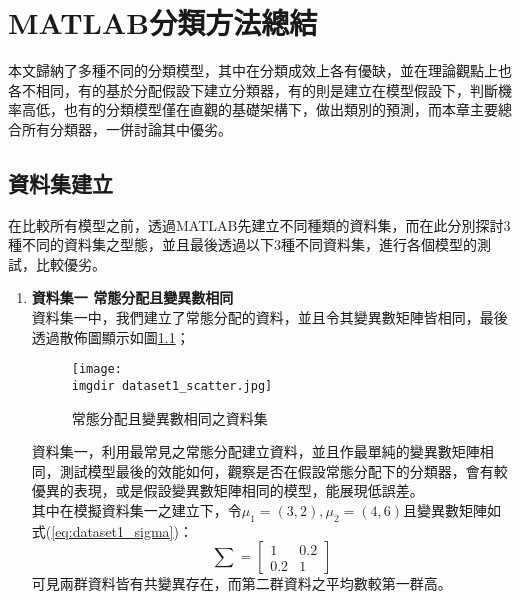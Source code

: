 \chapter{ \MJH MATLAB分類方法總結}
本文歸納了多種不同的分類模型，其中在分類成效上各有優缺，並在理論觀點上也各不相同，有的基於分配假設下建立分類器，有的則是建立在模型假設下，判斷機率高低，也有的分類模型僅在直觀的基礎架構下，做出類別的預測，而本章主要總合所有分類器，一併討論其中優劣。
\section{資料集建立}
在比較所有模型之前，透過MATLAB先建立不同種類的資料集，而在此分別探討3種不同的資料集之型態，並且最後透過以下3種不同資料集，進行各個模型的測試，比較優劣。
	\begin{enumerate}
	\item{\textbf{資料集一 常態分配且變異數相同}\\
	資料集一中，我們建立了常態分配的資料，並且令其變異數矩陣皆相同，最後透過散佈圖顯示如圖\ref{fig:dataset1_scatter}；
	\begin{figure}[H]	
		\centering	 			 	 
   		\texttt{[image: \\imgdir dataset1\_scatter.jpg]} 
   		\caption{常態分配且變異數相同之資料集}
   		\label{fig:dataset1_scatter}   			 		 
	\end{figure}
	資料集一，利用最常見之常態分配建立資料，並且作最單純的變異數矩陣相同，測試模型最後的效能如何，觀察是否在假設常態分配下的分類器，會有較優異的表現，或是假設變異數矩陣相同的模型，能展現低誤差。	
\\	
	其中在模擬資料集一之建立下，令$\mu_1 = (3,2),\mu_2 =(4,6)$且變異數矩陣如式(\ref{eq:dataset1_sigma})：
	\begin{equation} \label{eq:dataset1_sigma}
	\sum = \left[
            \begin{array}{cc}
                1 & 0.2 \\
                0.2 & 1    
            \end{array} \right]
    \end{equation}
    可見兩群資料皆有共變異存在，而第二群資料之平均數較第一群高。
	}
	

\end{enumerate}
